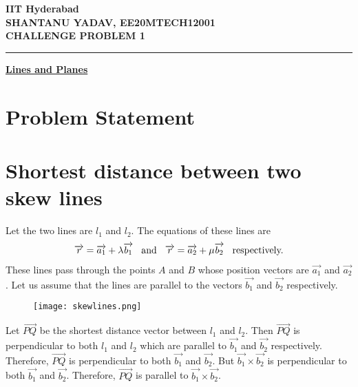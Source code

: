 \documentclass[12pt]{article}
\begin{document}
\begin{center}
	{\Large \bf IIT Hyderabad} \\ \vspace{2ex}
	{\large \bf SHANTANU YADAV, EE20MTECH12001 }\\
	\vspace{2ex}
	{\large \bf CHALLENGE PROBLEM 1} \\
\end{center}
	\hrule

\vspace{2ex}
\begin{center}
{\underline{\Large \bf Lines and Planes}}
\end{center}

\section*{Problem Statement}


\section*{Shortest distance between two skew lines}
	Let the two lines are $l_1$ and $l_2$. The equations of these lines are
\begin{align*}
\overrightarrow{r} = \overrightarrow{a_1} + \lambda \overrightarrow{b_1}
\hspace{2ex} \text{and} \hspace{2ex} 
\overrightarrow{r} = \overrightarrow{a_2} + \mu \overrightarrow{b_2}
\hspace{2ex} \text{respectively.}
\end{align*}
These lines pass through the points $A$ and $B$ whose position vectors are
$\overrightarrow{a_1}$ and  $\overrightarrow{a_2}$.
Let us assume that the lines are parallel to the vectors 
$\overrightarrow{b_1}$ and  $\overrightarrow{b_2}$ respectively.

\begin{figure}[htbp]
	\centering
\texttt{[image: skewlines.png]}
\end{figure}

\noindent
Let $\overrightarrow{PQ}$ be the shortest distance vector between $l_1$ and
$l_2$. Then $\overrightarrow{PQ}$ is perpendicular to both
$l_1$ and $l_2$ which are parallel to
$\overrightarrow{b_1}$ and  $\overrightarrow{b_2}$ respectively.
Therefore, $\overrightarrow{PQ}$ is perpendicular to both
$\overrightarrow{b_1}$ and  $\overrightarrow{b_2}$. 
But $\overrightarrow{b_1} \times \overrightarrow{b_2}$ is perpendicular to both
$\overrightarrow{b_1}$ and  $\overrightarrow{b_2}$. 
Therefore, $\overrightarrow{PQ}$ is parallel to
$\overrightarrow{b_1} \times \overrightarrow{b_2}$.
\\
\end{document}
